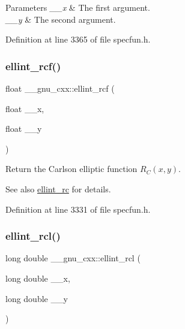 \begin{DoxyParams}{Parameters}
{\em \+\_\+\+\_\+x} & The first argument. \\
\hline
{\em \+\_\+\+\_\+y} & The second argument. \\
\hline
\end{DoxyParams}


Definition at line 3365 of file specfun.\+h.

\mbox{\label{group__mathsf__gnu_gaad5316092224ec3d92b66e79ef266adf}} 
\subsubsection{\texorpdfstring{ellint\+\_\+rcf()}{ellint\_rcf()}}
{\footnotesize\ttfamily float \+\_\+\+\_\+gnu\+\_\+cxx\+::ellint\+\_\+rcf (\begin{DoxyParamCaption}\item[{float}]{\+\_\+\+\_\+x,  }\item[{float}]{\+\_\+\+\_\+y }\end{DoxyParamCaption})\hspace{0.3cm}{\ttfamily [inline]}}

Return the Carlson elliptic function $ R_C(x,y) $.

\begin{DoxySeeAlso}{See also}
\hyperlink{group__mathsf__gnu_ga7d3d42f5f71a74266be8aaca528056bf}{ellint\+\_\+rc} for details. 
\end{DoxySeeAlso}


Definition at line 3331 of file specfun.\+h.

\mbox{\label{group__mathsf__gnu_ga9b2f1cdeacd3615c702a77d995a0129c}} 
\subsubsection{\texorpdfstring{ellint\+\_\+rcl()}{ellint\_rcl()}}
{\footnotesize\ttfamily long double \+\_\+\+\_\+gnu\+\_\+cxx\+::ellint\+\_\+rcl (\begin{DoxyParamCaption}\item[{long double}]{\+\_\+\+\_\+x,  }\item[{long double}]{\+\_\+\+\_\+y }\end{DoxyParamCaption})\hspace{0.3cm}{\ttfamily [inline]}}

